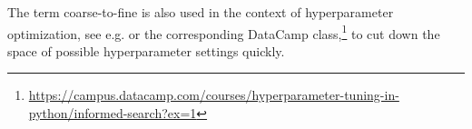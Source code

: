 The term coarse-to-fine is also used in the context of hyperparameter optimization, see e.g.  or the corresponding DataCamp class,\footnote{\url{https://campus.datacamp.com/courses/hyperparameter-tuning-in-python/informed-search?ex=1}} to cut down the space of possible hyperparameter settings quickly.







